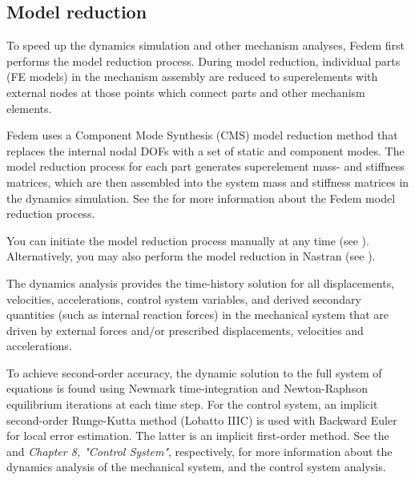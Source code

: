 \clearpage



\subsection{Model reduction}

To speed up the dynamics simulation and other mechanism analyses,
Fedem first performs the model reduction process.
During model reduction, individual parts (FE models) in the mechanism assembly
are reduced to superelements with external nodes at those points which connect
parts and other mechanism elements.

Fedem uses a Component Mode Synthesis (CMS) model reduction method that replaces
the internal nodal DOFs with a set of static and component modes.
The model reduction process for each part generates superelement mass- and
stiffness matrices, which are then assembled into the system mass and stiffness
matrices in the dynamics simulation.
See the 
for more information about the Fedem model reduction process.

You can initiate the model reduction process manually at any time
(see ).
Alternatively, you may also perform the model reduction in Nastran
(see ).



The dynamics analysis provides the time-history solution for all displacements,
velocities, accelerations, control system variables, and derived secondary
quantities (such as internal reaction forces) in the mechanical system that are
driven by external forces and/or prescribed displacements, velocities and
accelerations.

To achieve second-order accuracy, the dynamic solution to the full system of
equations is found using Newmark time-integration and Newton-Raphson equilibrium
iterations at each time step.
For the control system, an implicit second-order Runge-Kutta method
(Lobatto IIIC) is used with Backward Euler for local error estimation.
The latter is an implicit first-order method.
See the 
and {\sl Chapter 8, "Control System"}, respectively, for more information about
the dynamics analysis of the mechanical system, and the control system analysis.


